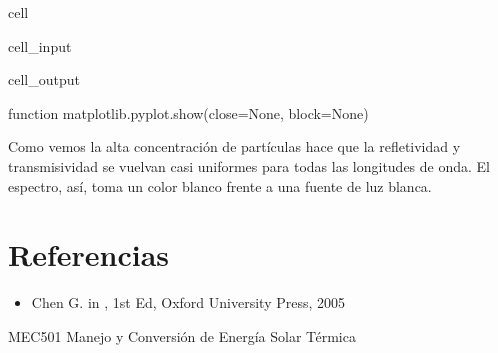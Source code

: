 \documentclass[letterpaper,10pt,english]{jupyterBook}
\begin{document}
\begin{sphinxuseclass}{cell}\begin{sphinxVerbatimInput}

\begin{sphinxuseclass}{cell_input}
\begin{sphinxVerbatim}[commandchars=\\\{\}]
\end{sphinxVerbatim}

\end{sphinxuseclass}\end{sphinxVerbatimInput}
\begin{sphinxVerbatimOutput}

\begin{sphinxuseclass}{cell_output}
\begin{sphinxVerbatim}[commandchars=\\\{\}]
\PYGZlt{}function matplotlib.pyplot.show(close=None, block=None)\PYGZgt{}
\end{sphinxVerbatim}

\noindent{}

\end{sphinxuseclass}\end{sphinxVerbatimOutput}

\end{sphinxuseclass}
\sphinxAtStartPar
Como vemos la alta concentración de partículas hace que la refletividad y transmisividad se vuelvan casi uniformes para todas las longitudes de onda. El espectro, así, toma un color blanco frente a una fuente de luz blanca.


\section{Referencias}
\label{\detokenize{5_TransporteRadiativo/5_TransporteRadiativo:referencias}}\begin{itemize}
\item {} 
\sphinxAtStartPar
Chen G.  in , 1st Ed, Oxford University Press, 2005

\end{itemize}

\sphinxstepscope

\sphinxAtStartPar
MEC501 \sphinxhyphen{} Manejo y Conversión de Energía Solar Térmica
\end{document}
